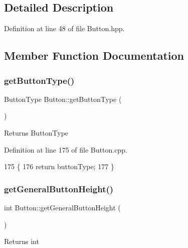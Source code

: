 \subsection{Detailed Description}


Definition at line 48 of file Button.\+hpp.



\subsection{Member Function Documentation}
\mbox{\label{class_button_afb53df1bb22e22c20d15b055cfa878dc}} 
\subsubsection{\texorpdfstring{get\+Button\+Type()}{getButtonType()}}
{\footnotesize\ttfamily Button\+Type Button\+::get\+Button\+Type (\begin{DoxyParamCaption}{ }\end{DoxyParamCaption})}

\begin{DoxyReturn}{Returns}
Button\+Type 
\end{DoxyReturn}


Definition at line 175 of file Button.\+cpp.


\begin{DoxyCode}
175                                  \{
176     \textcolor{keywordflow}{return} buttonType;
177 \}
\end{DoxyCode}
\mbox{\label{class_button_a577d80e982292d7b17584d11e650dca6}} 
\subsubsection{\texorpdfstring{get\+General\+Button\+Height()}{getGeneralButtonHeight()}}
{\footnotesize\ttfamily int Button\+::get\+General\+Button\+Height (\begin{DoxyParamCaption}{ }\end{DoxyParamCaption})}

\begin{DoxyReturn}{Returns}
int 
\end{DoxyReturn}


